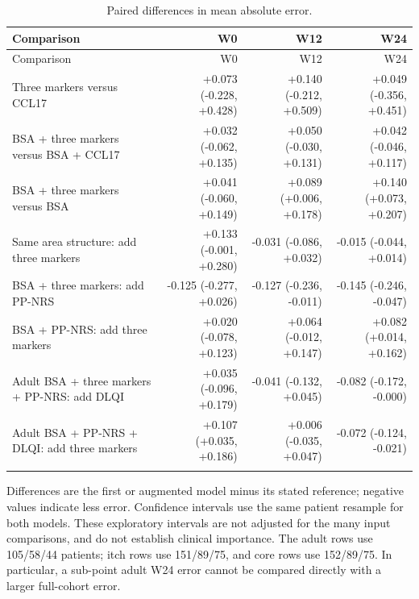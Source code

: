 {\small\setlength{\tabcolsep}{4pt}
\begin{longtable}{p{53mm}rrr}
\caption{Paired differences in mean absolute error.}\label{tab:ablation_differences}\\
\toprule Comparison & W0 & W12 & W24 \\ \midrule\endfirsthead
\toprule Comparison & W0 & W12 & W24 \\ \midrule\endhead
Three markers versus CCL17 & +0.073 (-0.228, +0.428) & +0.140 (-0.212, +0.509) & +0.049 (-0.356, +0.451) \\ \addlinespace
BSA + three markers versus BSA + CCL17 & +0.032 (-0.062, +0.135) & +0.050 (-0.030, +0.131) & +0.042 (-0.046, +0.117) \\ \addlinespace
BSA + three markers versus BSA & +0.041 (-0.060, +0.149) & +0.089 (+0.006, +0.178) & +0.140 (+0.073, +0.207) \\ \addlinespace
Same area structure: add three markers & +0.133 (-0.001, +0.280) & -0.031 (-0.086, +0.032) & -0.015 (-0.044, +0.014) \\ \addlinespace
BSA + three markers: add PP-NRS & -0.125 (-0.277, +0.026) & -0.127 (-0.236, -0.011) & -0.145 (-0.246, -0.047) \\ \addlinespace
BSA + PP-NRS: add three markers & +0.020 (-0.078, +0.123) & +0.064 (-0.012, +0.147) & +0.082 (+0.014, +0.162) \\ \addlinespace
Adult BSA + three markers + PP-NRS: add DLQI & +0.035 (-0.096, +0.179) & -0.041 (-0.132, +0.045) & -0.082 (-0.172, -0.000) \\ \addlinespace
Adult BSA + PP-NRS + DLQI: add three markers & +0.107 (+0.035, +0.186) & +0.006 (-0.035, +0.047) & -0.072 (-0.124, -0.021) \\ \addlinespace
\bottomrule\end{longtable}
}
\noindent\footnotesize Differences are the first or augmented model minus its stated reference; negative values indicate less error. Confidence intervals use the same patient resample for both models. These exploratory intervals are not adjusted for the many input comparisons, and do not establish clinical importance. The adult rows use 105/58/44 patients; itch rows use 151/89/75, and core rows use 152/89/75. In particular, a sub-point adult W24 error cannot be compared directly with a larger full-cohort error.\normalsize
